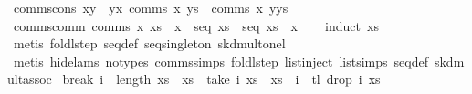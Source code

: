 \begin{isabellebody}
{}\ comms{}cons{}\ {}{}x{}y\ {}\ y{}x{}\ comms\ x\ ys{}\ {}\ comms\ x\ {}y{}ys{}{}\isanewline
\isanewline
{}\isamarkupfalse%
\ comms{}comm{}\ {}comms\ x\ xs\ {}\ x\ {}\ seq\ xs\ {}\ seq\ xs\ {}\ x{}\isanewline
%
\isadelimproof
\ \ %
\endisadelimproof
%
\isatagproof
{}\isamarkupfalse%
\ {}induct\ xs{}\isanewline
\ \ \isamarkupfalse%
\ {}metis\ foldl{}step\ seq{}def\ seq{}singleton\ skd{}mult{}onel{}\isanewline
\ \ \isamarkupfalse%
\ {}metis\ {}hide{}lams{}\ no{}types{}\ comms{}simps\ foldl{}step\ list{}inject\ list{}simps{}{}{}\ seq{}def\ skd{}mult{}assoc{}%
\endisatagproof
{\isafoldproof}%
%
\isadelimproof
\isanewline
%
\endisadelimproof
\isanewline
{}\isamarkupfalse%
\ break{}\ {}i\ {}\ length\ xs\ {}\ xs\ {}\ take\ i\ xs\ {}\ xs\ {}\ i\ {}\ tl\ {}drop\ i\ xs{}{}\isanewline

\end{isabellebody}
